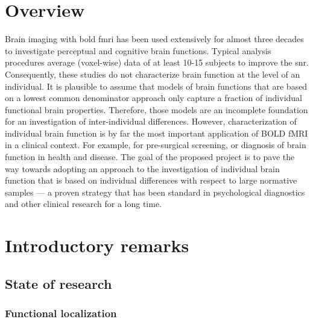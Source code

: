 \section{Overview}




%
Brain imaging with \ac{bold} \ac{fmri} has been used extensively for almost
three decades to investigate perceptual and cognitive brain functions.
%
Typical analysis procedures average (voxel-wise) data of at least 10-15 subjects
to improve the \ac{snr}.
%
Consequently, these studies do not characterize brain function at the level of
an individual.
%
It is plausible to assume that models of brain functions that are based on a
lowest common denominator approach only capture a fraction of individual
functional brain properties.
%
Therefore, those models are an incomplete foundation for an investigation of
inter-individual differences.
%
However, characterization of individual brain function is by far the most
important application of BOLD fMRI in a clinical context.
%
For example, for pre-surgical screening, or diagnosis of brain function in
health and disease.
%
The goal of the proposed project is to pave the way towards adopting an approach
to the investigation of individual brain function that is based on individual
differences with respect to large normative samples --- a proven strategy that
has been standard in psychological diagnostics and other clinical research for a
long time.


\section{Introductory remarks}


\subsection{State of research}


\subsubsection{Functional localization}


